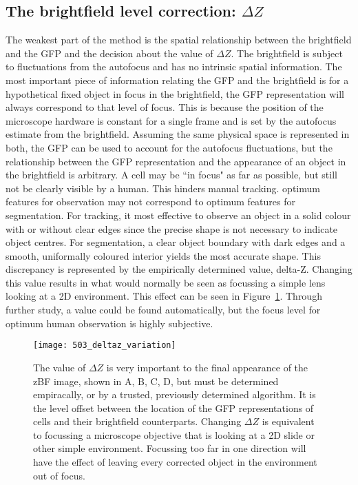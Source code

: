 \subsection{The brightfield level correction: $\Delta Z$}

The weakest part of the method is the spatial relationship between the brightfield and the GFP and the decision about the value of $\Delta Z$. The brightfield is subject to fluctuations from the autofocus and has no intrinsic spatial information. The most important piece of information relating the GFP and the brightfield is for a hypothetical fixed object in focus in the brightfield, the GFP representation will always correspond to that level of focus. This is because the position of the microscope hardware is constant for a single frame and is set by the autofocus estimate from the brightfield. Assuming the same physical space is represented in both, the GFP can be used to account for the autofocus fluctuations, but the relationship between the GFP representation and the appearance of an object in the brightfield is arbitrary. A cell may be ``in focus" as far as possible, but still not be clearly visible by a human. This hinders manual tracking. optimum features for observation may not correspond to optimum features for segmentation. For tracking, it most effective to observe an object in a solid colour with or without clear edges since the precise shape is not necessary to indicate object centres. For segmentation, a clear object boundary with dark edges and a smooth, uniformally coloured interior yields the most accurate shape. This discrepancy is represented by the empirically determined value, delta-Z. Changing this value results in what would normally be seen as focussing a simple lens looking at a 2D environment. This effect can be seen in Figure~\ref{fig:deltazvariation}. Through further study, a value could be found automatically, but the focus level for optimum human observation is highly subjective.

\begin{figure}[h!]
 \centering
 \texttt{[image: 503\_deltaz\_variation]}
 \caption[Varying $\Delta Z$]{
 	The value of $\Delta Z$ is very important to the final appearance of the zBF image, shown in A, B, C, D, but must be determined empiracally, or by a trusted, previously determined algorithm. It is the level offset between the location of the GFP representations of cells and their brightfield counterparts. Changing $\Delta Z$ is equivalent to focussing a microscope objective that is looking at a 2D slide or other simple environment. Focussing too far in one direction will have the effect of leaving every corrected object in the environment out of focus.
 }
 \label{fig:deltazvariation}
\end{figure}

